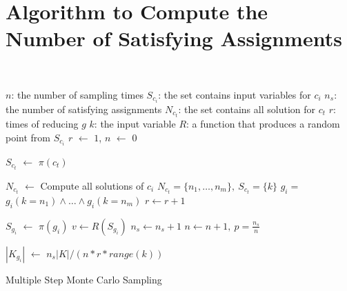 \section{Algorithm to Compute the Number of Satisfying Assignments}
\label{appendix:montecarlo}
~
{\small
\IncMargin{1em}
\begin{algorithm}\small
    \SetAlgoLined
    \DontPrintSemicolon


    $n$: the number of sampling times \;
    $S_{c_i}$: the set contains input variables for $c_{i}$ \;
    $n_{s}$: the number of satisfying assignments \;
    $N_{c_t}$: the set contains all solution for $c_t$ \;
    $r$: times of reducing $g$\;
    $k$: the input variable \;
    $R$: a function that produces a random point from $S_{c_i}$\;
    $r$ $\leftarrow$ $1$,
    $n$ $\leftarrow$ $0$ \;
     {
        $S_{c_t}$ $\leftarrow$ $\pi(c_t)$ \;
        {
            $N_{c_t}$ $\leftarrow$ Compute all solutions of $c_i$ \;
            $N_{c_t} = \{n_1, \ldots, n_m\},\ S_{c_t} = \{k\}  $ \;
            $g_{i} = $ $g_i(k=n_1) \land \ldots \land g_i(k=n_m)$ \;
            $r \leftarrow r+1$ \;

        }
    }
     {
        $S_{g_i}$ $\leftarrow$ $\pi(g_i)$ \;
        $v \leftarrow R(S_{g_i})$ 
        {
           $n_s \leftarrow n_s + 1$
        }
        $n \leftarrow n +1,\ p = \frac{n_s}{n}$
    }

    $|K_{g_{i}}|$ $\leftarrow$ $n_s|K| / (n * r * range(k))$
    \caption{Multiple Step Monte Carlo Sampling}
\end{algorithm}
\DecMargin{1em}
}

